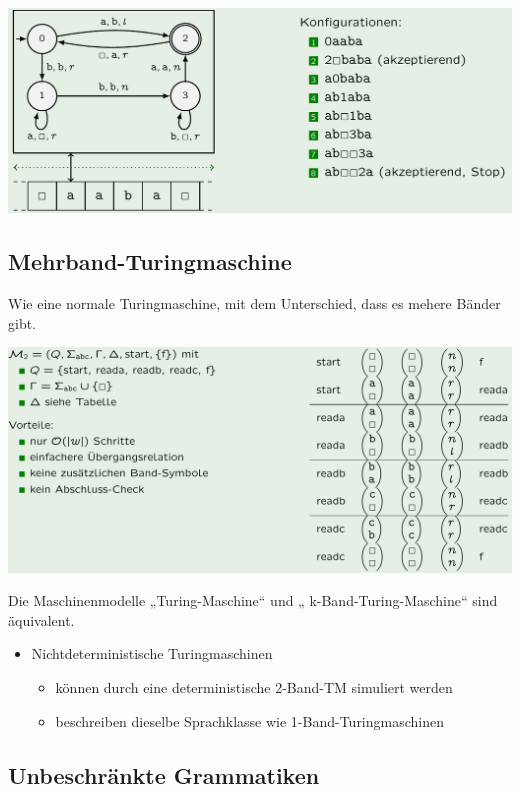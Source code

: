 \documentclass[12pt,a4paper]{article}
\begin{document}
	\begin{center}
	\includegraphics[width=\textwidth]{Bilder/Turing.png}
	\end{center}
	
	\subsection{Mehrband-Turingmaschine}
	
	Wie eine normale Turingmaschine, mit dem Unterschied, dass es mehere Bänder gibt.
	\begin{center}
		\includegraphics[width=\textwidth]{Bilder/MehrbandTuring.png}
	\end{center}
Die Maschinenmodelle „Turing-Maschine“ und „ k-Band-Turing-Maschine“ sind äquivalent.\newline
	
	\begin{itemize}
	\item Nichtdeterministische Turingmaschinen
	\begin{itemize}
	\item können durch eine deterministische 2-Band-TM simuliert werden
	\item beschreiben dieselbe Sprachklasse wie 1-Band-Turingmaschinen
	\end{itemize}
	\end{itemize}

	\subsection{Unbeschränkte Grammatiken}
\end{document}
